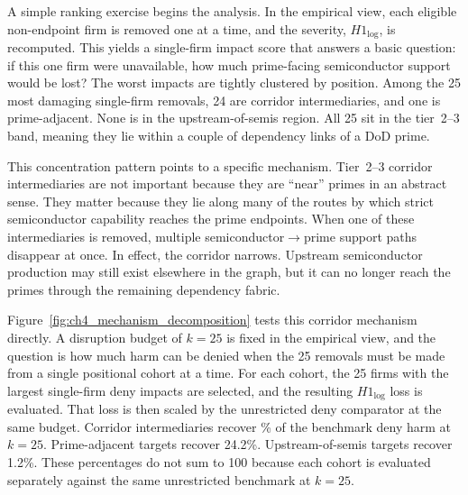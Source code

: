 A simple ranking exercise begins the analysis. In the empirical view, each eligible non-endpoint firm is removed one at a time, and the severity, $H1_{\log}$, is recomputed. This yields a single-firm impact score that answers a basic question: if this one firm were unavailable, how much prime-facing semiconductor support would be lost? The worst impacts are tightly clustered by position. Among the 25 most damaging single-firm removals, 24 are corridor intermediaries, and one is prime-adjacent. None is in the upstream-of-semis region. All 25 sit in the tier~2--3 band, meaning they lie within a couple of dependency links of a DoD prime.

This concentration pattern points to a specific mechanism. Tier~2--3 corridor intermediaries are not important because they are ``near'' primes in an abstract sense. They matter because they lie along many of the routes by which strict semiconductor capability reaches the prime endpoints. When one of these intermediaries is removed, multiple semiconductor$\rightarrow$prime support paths disappear at once. In effect, the corridor narrows. Upstream semiconductor production may still exist elsewhere in the graph, but it can no longer reach the primes through the remaining dependency fabric.

Figure~\ref{fig:ch4_mechanism_decomposition} tests this corridor mechanism directly. A disruption budget of $k=25$ is fixed in the empirical view, and the question is how much harm can be denied when the 25 removals must be made from a single positional cohort at a time. For each cohort, the 25 firms with the largest single-firm deny impacts are selected, and the resulting $H1_{\log}$ loss is evaluated. That loss is then scaled by the unrestricted deny comparator at the same budget. Corridor intermediaries recover \CorridorRecovery\% of the benchmark deny harm at $k=25$. Prime-adjacent targets recover 24.2\%. Upstream-of-semis targets recover 1.2\%. These percentages do not sum to 100 because each cohort is evaluated separately against the same unrestricted benchmark at $k=25$.

